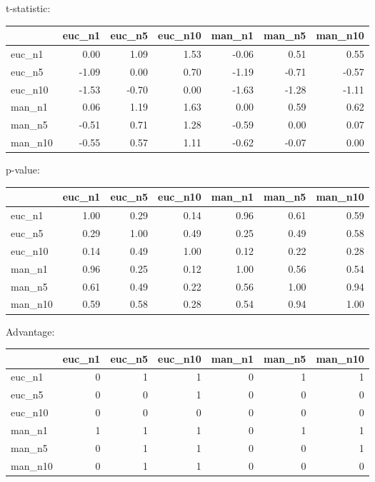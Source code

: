 t-statistic:
 \begin{tabular}{lrrrrrr}
\hline
         &   euc\_n1 &   euc\_n5 &   euc\_n10 &   man\_n1 &   man\_n5 &   man\_n10 \\
\hline
 euc\_n1  &     0.00 &     1.09 &      1.53 &    -0.06 &     0.51 &      0.55 \\
 euc\_n5  &    -1.09 &     0.00 &      0.70 &    -1.19 &    -0.71 &     -0.57 \\
 euc\_n10 &    -1.53 &    -0.70 &      0.00 &    -1.63 &    -1.28 &     -1.11 \\
 man\_n1  &     0.06 &     1.19 &      1.63 &     0.00 &     0.59 &      0.62 \\
 man\_n5  &    -0.51 &     0.71 &      1.28 &    -0.59 &     0.00 &      0.07 \\
 man\_n10 &    -0.55 &     0.57 &      1.11 &    -0.62 &    -0.07 &      0.00 \\
\hline
\end{tabular} 

p-value:
 \begin{tabular}{lrrrrrr}
\hline
         &   euc\_n1 &   euc\_n5 &   euc\_n10 &   man\_n1 &   man\_n5 &   man\_n10 \\
\hline
 euc\_n1  &     1.00 &     0.29 &      0.14 &     0.96 &     0.61 &      0.59 \\
 euc\_n5  &     0.29 &     1.00 &      0.49 &     0.25 &     0.49 &      0.58 \\
 euc\_n10 &     0.14 &     0.49 &      1.00 &     0.12 &     0.22 &      0.28 \\
 man\_n1  &     0.96 &     0.25 &      0.12 &     1.00 &     0.56 &      0.54 \\
 man\_n5  &     0.61 &     0.49 &      0.22 &     0.56 &     1.00 &      0.94 \\
 man\_n10 &     0.59 &     0.58 &      0.28 &     0.54 &     0.94 &      1.00 \\
\hline
\end{tabular} 

Advantage:
 \begin{tabular}{lrrrrrr}
\hline
         &   euc\_n1 &   euc\_n5 &   euc\_n10 &   man\_n1 &   man\_n5 &   man\_n10 \\
\hline
 euc\_n1  &        0 &        1 &         1 &        0 &        1 &         1 \\
 euc\_n5  &        0 &        0 &         1 &        0 &        0 &         0 \\
 euc\_n10 &        0 &        0 &         0 &        0 &        0 &         0 \\
 man\_n1  &        1 &        1 &         1 &        0 &        1 &         1 \\
 man\_n5  &        0 &        1 &         1 &        0 &        0 &         1 \\
 man\_n10 &        0 &        1 &         1 &        0 &        0 &         0 \\
\hline
\end{tabular} 

